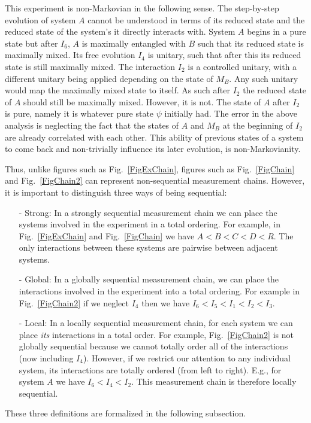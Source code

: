 \documentclass[prd,twocolumn,superscriptaddress,floatfix,amsmath,amssymb,amsfonts,nofootinbib]{revtex4-2}
\begin{document}
This experiment is non-Markovian in the following sense. The step-by-step evolution of system $A$ cannot be understood in terms of its reduced state and the reduced state of the system's it directly interacts with. System $A$ begins in a pure state but after $I_6$, $A$ is maximally entangled with $B$ such that its reduced state is maximally mixed. Its free evolution $I_4$ is unitary, such that after this its reduced state is still maximally mixed. The interaction $I_2$ is a controlled unitary, with a different unitary being applied depending on the state of $M_B$. Any such unitary would map the maximally mixed state to itself. As such after $I_2$ the reduced state of $A$ should still be maximally mixed. However, it is not. The state of $A$ after $I_2$ is pure, namely it is whatever pure state $\psi$ initially had. The error in the above analysis is neglecting the fact that the states of $A$ and $M_B$ at the beginning of $I_2$ are already correlated with each other. This ability of previous states of a system to come back and non-trivially influence its later evolution, is non-Markovianity.

Thus, unlike figures such as Fig.~\ref{FigExChain},  figures such as Fig.~\ref{FigChain} and Fig.~\ref{FigChain2} can represent non-sequential measurement chains. However, it is important to distinguish three ways of being sequential:
\begin{itemize}
    \item[-] Strong: In a strongly sequential measurement chain we can place the systems involved in the experiment in a total ordering. For example, in Fig.~\ref{FigExChain} and Fig.~\ref{FigChain} we have  \mbox{$A < B < C < D < R$}. The only interactions between these systems are pairwise between adjacent systems. 
    \item[-] Global: In a globally sequential measurement chain, we can place the interactions involved in the experiment into a total ordering. For example in Fig.~\ref{FigChain2} if we neglect $I_4$ then we have \mbox{$I_6 < I_5 < I_1 < I_2 < I_3$}.
    \item[-] Local: In a locally sequential measurement chain, for each system we can place \textit{its} interactions in a total order. For example, Fig.~\ref{FigChain2} is not globally sequential because we cannot totally order all of the interactions (now including $I_4$). However, if we restrict our attention to any individual system, its interactions are totally ordered (from left to right). E.g., for system $A$ we have \mbox{$I_6 < I_4 < I_2$}. This measurement chain is therefore locally sequential.
\end{itemize}
These three definitions are formalized in the following subsection.
\end{document}
